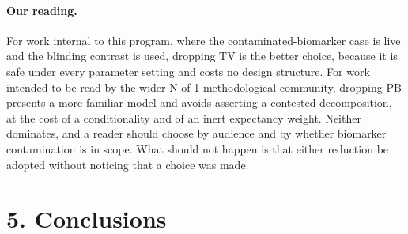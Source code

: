 \documentclass[
  11pt,
]{article}
\begin{document}
\paragraph{Our reading.}

For work internal to this program, where the
contaminated-biomarker case is live and the blinding contrast is used,
dropping TV is the better choice, because it is safe under every
parameter setting and costs no design structure. For work intended to
be read by the wider N-of-1 methodological community, dropping PB
presents a more familiar model and avoids asserting a contested
decomposition, at the cost of a conditionality and of an inert
expectancy weight. Neither dominates, and a reader should choose by
audience and by whether biomarker contamination is in scope. What
should not happen is that either reduction be adopted without
noticing that a choice was made.

\section{5. Conclusions}
\end{document}
